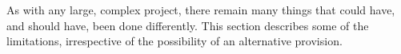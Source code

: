 As with any large, complex project, there remain many things that could have, and should have, been done differently.
This section describes some of the limitations, irrespective of the possibility of an alternative provision.
